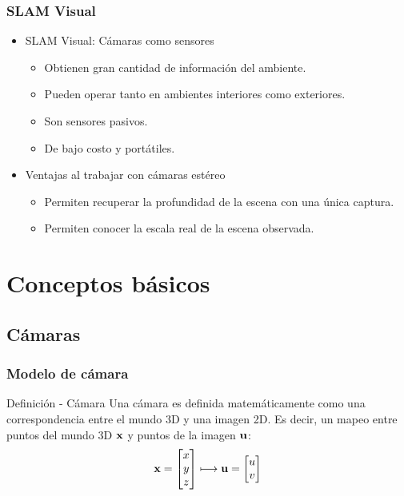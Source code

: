 \documentclass[compress]{beamer}
\begin{document}
\begin{frame}
	\frametitle{SLAM Visual}
    \begin{itemize}
        \item SLAM Visual: Cámaras como sensores
        \begin{itemize}
            \item Obtienen gran cantidad de información del ambiente.
            \item Pueden operar tanto en ambientes interiores como exteriores.
            \item Son sensores pasivos.
            \item De bajo costo y portátiles.
        \end{itemize}
    \end{itemize}
    
    \pause{}
    \begin{itemize}
        \item Ventajas al trabajar con cámaras estéreo        
        \begin{itemize}
            \item Permiten recuperar la profundidad de la escena con una única captura.
            \item Permiten conocer la escala real de la escena observada.
        \end{itemize}
    \end{itemize}
\end{frame}


\section{Conceptos básicos}


\subsection{Cámaras}


\begin{frame}
\frametitle{Modelo de cámara}

\begin{block}{Definición - Cámara}
Una cámara es definida matemáticamente como una correspondencia entre el mundo 3D y una imagen 2D. Es decir, un mapeo entre puntos del mundo 3D $\boldsymbol{\mathbf{x}}$ y puntos de la imagen $\boldsymbol{\mathbf{u}}$:
\begin{equation}
\boldsymbol{\mathbf{x}}=\begin{bmatrix}x\\
y\\
z
\end{bmatrix}\longmapsto
\boldsymbol{\mathbf{u}}=\begin{bmatrix}u\\
v
\end{bmatrix}
\end{equation}
\end{block}

\end{frame}
\end{document}
